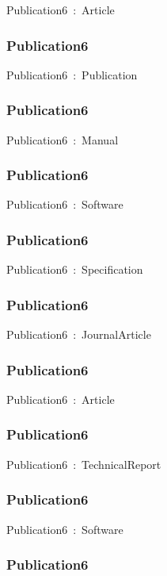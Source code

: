 \documentclass{article}
\begin{document}
Publication6~:~Article

\subsubsection*{Publication6}

Publication6~:~Publication

\subsubsection*{Publication6}

Publication6~:~Manual

\subsubsection*{Publication6}

Publication6~:~Software

\subsubsection*{Publication6}

Publication6~:~Specification

\subsubsection*{Publication6}

Publication6~:~JournalArticle

\subsubsection*{Publication6}

Publication6~:~Article

\subsubsection*{Publication6}

Publication6~:~TechnicalReport

\subsubsection*{Publication6}

Publication6~:~Software

\subsubsection*{Publication6}
\end{document}
